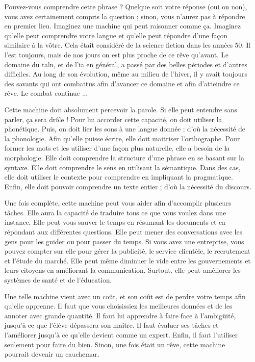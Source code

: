 \documentclass{KodeBook}
\begin{document}
\begin{discussion}

Pouvez-vous comprendre cette phrase ? 
Quelque soit votre réponse (oui ou non), vous avez certainement compris la question ; sinon, vous n'aurez pas à répondre en premier lieu. 
Imaginez une machine qui peut raisonner comme ça. 
Imaginez qu'elle peut comprendre votre langue et qu'elle peut répondre d'une façon similaire à la vôtre. 
Cela était considéré de la science fiction dans les années 50.
Il l'est toujours, mais de nos jours on est plus proche de ce rêve qu'avant. 
Le domaine du \ac{taln}, et de l'\ac{ia} en général, a passé par des belles périodes et d'autres difficiles. 
Au long de son évolution, même au milieu de l'hiver, il y avait toujours des savants qui ont combattus afin d'avancer ce domaine et afin d'atteindre ce rêve. 
Le combat continue ...

Cette machine doit absolument percevoir la parole.
Si elle peut entendre sans parler, ça sera drôle !
Pour lui accorder cette capacité, on doit utiliser la phonétique. 
Puis, on doit lier les sons à une langue donnée ; d'où la nécessité de la phonologie.
Afin qu'elle puisse écrire, elle doit maitriser l'orthographe.
Pour former les mots et les utiliser d'une façon plus naturelle, elle a besoin de la morphologie.
Elle doit comprendre la structure d'une phrase en se basant sur la syntaxe. 
Elle doit comprendre le sens en utilisant la sémantique.
Dans des cas, elle doit utiliser le contexte pour comprendre en impliquant la pragmatique. 
Enfin, elle doit pouvoir comprendre un texte entier ; d'où la nécessité du discours.

Une fois complète, cette machine peut vous aider afin d'accomplir plusieurs tâches. 
Elle aura la capacité de traduire tous ce que vous voulez dans une instance.
Elle peut vous sauver le temps en résumant les documents et en répondant aux différentes questions.
Elle peut mener des conversations avec les gens pour les guider ou pour passer du temps.
Si vous avez une entreprise, vous pouvez compter sur elle pour gérer la publicité, le service clientèle, le recrutement et l'étude du marché. 
Elle peut même diminuer le vide entre les gouvernements et leurs citoyens en améliorant la communication. 
Surtout, elle peut améliorer les systèmes de santé et de l'éducation.

Une telle machine vient avec un coût, et son coût est de perdre votre temps afin qu'elle apprenne. 
Il faut que vous choisissiez les meilleures données et de les annoter avec grande quantité. 
Il faut lui apprendre à faire face à l'ambigüité, jusqu'à ce que l'élève dépassera son maitre.
Il faut évaluer ses tâches et l'améliorer jusqu'à ce qu'elle devient comme un expert. 
Enfin, il faut l'utiliser seulement pour faire du bien. 
Sinon, une fois était un rêve, cette machine pourrait devenir un cauchemar.

\end{discussion}

\ifx\wholebook\relax\else
% 
% 
	
\end{document}
